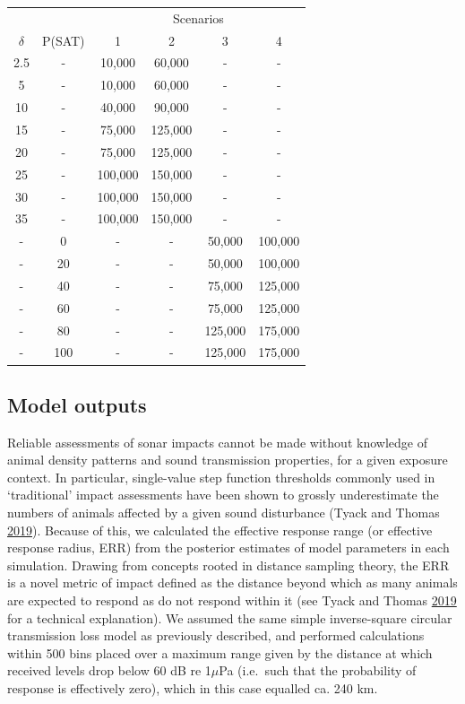 \documentclass[
]{article}
\begin{document}
\renewcommand{\arraystretch}{1.1}
\begin{table}[H]
\centering
\begin{tabular}{cccccc}
\toprule
\multicolumn{2}{c}{ } & \multicolumn{4}{c}{Scenarios} \\
\cmidrule(l{3pt}r{3pt}){3-6}
$\delta$ & P(SAT) & 1 & 2 & 3 & 4\\
\midrule
\rowcolor{gray!6}  2.5 & - & 10,000 & 60,000 & - & -\\
5 & - & 10,000 & 60,000 & - & -\\
\rowcolor{gray!6}  10 & - & 40,000 & 90,000 & - & -\\
15 & - & 75,000 & 125,000 & - & -\\
\rowcolor{gray!6}  20 & - & 75,000 & 125,000 & - & -\\
25 & - & 100,000 & 150,000 & - & -\\
\rowcolor{gray!6}  30 & - & 100,000 & 150,000 & - & -\\
35 & - & 100,000 & 150,000 & - & -\\
\rowcolor{gray!6}  - & 0 & - & - & 50,000 & 100,000\\
- & 20 & - & - & 50,000 & 100,000\\
\rowcolor{gray!6}  - & 40 & - & - & 75,000 & 125,000\\
- & 60 & - & - & 75,000 & 125,000\\
\rowcolor{gray!6}  - & 80 & - & - & 125,000 & 175,000\\
- & 100 & - & - & 125,000 & 175,000\\
\bottomrule
\end{tabular}
\end{table}

\subsection{Model outputs}
\hypertarget{section45}{}

Reliable assessments of sonar impacts cannot be made without knowledge of animal density patterns and sound transmission properties, for a given exposure context. In particular, single-value step function thresholds commonly used in `traditional' impact assessments have been shown to grossly underestimate the numbers of animals affected by a given sound disturbance (Tyack and Thomas \protect\hyperlink{ref-Tyack2019}{2019}). Because of this, we calculated the effective response range (or effective response radius, ERR) from the posterior estimates of model parameters in each simulation. Drawing from concepts rooted in distance sampling theory, the ERR is a novel metric of impact defined as the distance beyond which as many animals are expected to respond as do not respond within it (see Tyack and Thomas \protect\hyperlink{ref-Tyack2019}{2019} for a technical explanation). We assumed the same simple inverse-square circular transmission loss model as previously described, and performed calculations within 500 bins placed over a maximum range given by the distance at which received levels drop below 60 dB re 1\(\mu\)Pa (i.e.~such that the probability of response is effectively zero), which in this case equalled ca. 240 km.
\end{document}

